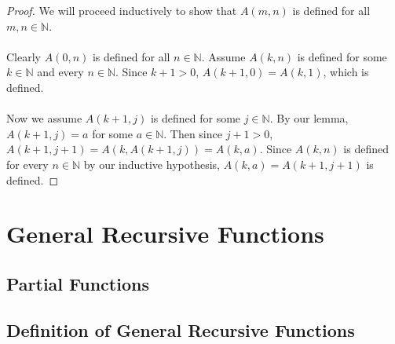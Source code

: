 \documentclass[12pt, letterpaper]{article}
\begin{document}
    \begin{proof}
      We will proceed inductively to show that $A(m, n)$ is defined for all $m, n \in \mathbb{N}$.
      \\ 
      \\
      Clearly $A(0, n)$ is defined for all $n \in \mathbb{N}$.
      Assume $A(k, n)$ is defined for some $k \in \mathbb{N}$ and every $n \in \mathbb{N}$.
      Since $k + 1 > 0$, $A(k + 1, 0) = A(k, 1)$, which is defined.
      \\
      \\
      Now we assume $A(k + 1, j)$ is defined for some $j \in \mathbb{N}$.
      By our lemma, $A(k + 1, j) = a$ for some $a \in \mathbb{N}$.
      Then since $j + 1 > 0$, $A(k + 1, j + 1) = A(k, A(k + 1, j)) = A(k, a)$.
      Since $A(k, n)$ is defined for every $n \in \mathbb{N}$ by our inductive hypothesis,
      $A(k, a) = A(k + 1, j + 1)$ is defined.
    \end{proof}


  \section{General Recursive Functions}
    \subsection{Partial Functions}
    \subsection{Definition of General Recursive Functions}
\end{document}
